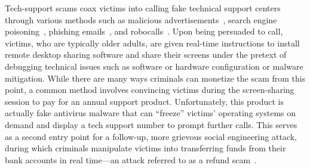  Tech-support scams coax victims into calling fake technical support centers through various methods such as malicious advertisements~\cite{seacma,MiramirkhaniSN16}, search engine poisoning~\cite{SrinivasanKMANA18}, phishing emails~\cite{tasr}, and robocalls~\cite{PrasadDRR23}. Upon being persuaded to call, victims, who are typically older adults, are given real-time instructions to install remote desktop sharing software and share their screens under the pretext of debugging technical issues such as software or hardware configuration or malware mitigation. While there are many ways criminals can monetize the scam from this point, a common method involves convincing victims during the screen-sharing session to pay for an annual support product. Unfortunately, this product is actually fake antivirus malware that can ``freeze'' victims' operating systems on demand and display a tech support number to prompt further calls. This serves as a second entry point for a follow-up, more grievous social engineering attack, during which criminals manipulate victims into transferring funds from their bank accounts in real time—an attack referred to as a refund scam~\cite{tasr}.

